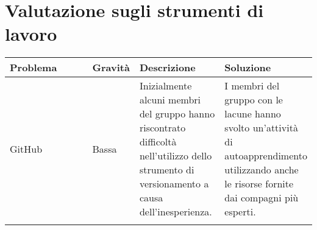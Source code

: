 \section{Valutazione sugli strumenti di lavoro}
    \begin{table}[H]
        \centering
        \begin{tabular}{|p{0.3\linewidth}|p{0.11\linewidth}|p{0.29\linewidth}|p{0.3\linewidth}|}
        \hline
        \rowcolor[HTML]{036400}
        {\color[HTML]{FFFFFF} \textbf{Problema}} & {\color[HTML]{FFFFFF} \textbf{Gravità}} & {\color[HTML]{FFFFFF} \textbf{Descrizione}} & {\color[HTML]{FFFFFF} \textbf{Soluzione}} \\ \hline
        \rowcolor[HTML]{EFEFEF}
        GitHub& Bassa & Inizialmente alcuni membri del gruppo hanno riscontrato difficoltà nell'utilizzo dello strumento di versionamento a causa dell'inesperienza. & I membri del gruppo con le lacune hanno svolto un'attività di autoapprendimento utilizzando anche le risorse fornite dai compagni più esperti. \\ \hline
        \rowcolor[HTML]{C0C0C0}
        \end{tabular}
    \end{table}
